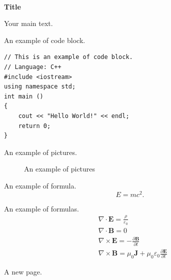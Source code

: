 \documentclass{article}
\begin{document}
	\pagestyle{preContent}
	\  \newline
	\begin{center}
		\textbf{\Large{Title} \\ \raisebox{-1ex}{***}}
	\end{center}


	Your main text.

	An example of code block.
	\begin{lstlisting}
// This is an example of code block.
// Language: C++
#include <iostream>
using namespace std;
int main ()
{
	cout << "Hello World!" << endl;
	return 0;
}
	\end{lstlisting}

	An example of pictures.
	\begin{figure}[H]
		\centering
		\caption{An example of pictures}
	\end{figure}

	An example of formula.
	\begin{equation}
		E = mc^2.
	\end{equation}

	An example of formulas.
	\begin{align*}
		&\nabla \cdot \mathbf{E}=\frac{\rho}{\varepsilon_{0}} \\
		&\nabla \cdot \mathbf{B}=0 \\
		&\nabla \times \mathbf{E}=-\frac{\partial \mathbf{B}}{\partial t} \\
		&\nabla \times \mathbf{B}=\mu_{0} \mathbf{J}+\mu_{0} \varepsilon_{0} \frac{\partial \mathbf{E}}{\partial t}
	\end{align*}

	\quad \newline \quad

	\newpage
	A new page.
\end{document}
